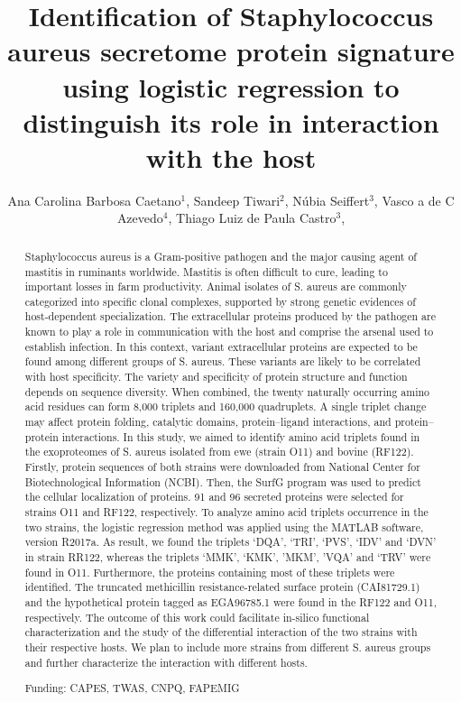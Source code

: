 \documentclass[twoside]{article}
\title{\vspace{-15mm}\fontsize{24pt}{10pt}\selectfont\textbf{ Identification of Staphylococcus aureus secretome protein signature using logistic regression to distinguish its role in interaction with the host }} %
\author{ Ana Carolina Barbosa Caetano$^{1}$, Sandeep Tiwari$^{2}$, Núbia Seiffert$^{3}$, Vasco a de C Azevedo$^{4}$, Thiago Luiz de Paula Castro$^{3}$, }
\affil{ 1 Universidade Federal de Minas Gerais

2 Institute of Biological Science, Federal University of Minas Gerais, Belo Horizonte

3 Federal University of Bahia

4 Federal University of Minas Gerais

 }
\date{}
\begin{document}
  
  
  \maketitle %
  
  
  \thispagestyle{fancy} %
  
  
  \begin{abstract}
  Staphylococcus aureus is a Gram-positive pathogen and the major causing agent of mastitis in ruminants worldwide. Mastitis is often difficult to cure, leading to important losses in farm productivity. Animal isolates of S. aureus are commonly categorized into specific clonal complexes, supported by strong genetic evidences of host-dependent specialization. The extracellular proteins produced by the pathogen are known to play a role in communication with the host and comprise the arsenal used to establish infection. In this context, variant extracellular proteins are expected to be found among different groups of S. aureus. These variants are likely to be correlated with host specificity. The variety and specificity of protein structure and function depends on sequence diversity. When combined, the twenty naturally occurring amino acid residues can form 8,000 triplets and 160,000 quadruplets. A single triplet change may affect protein folding, catalytic domains, protein–ligand interactions, and protein–protein interactions. In this study, we aimed to identify amino acid triplets found in the exoproteomes of S. aureus isolated from ewe (strain O11) and bovine (RF122). Firstly, protein sequences of both strains were downloaded from National Center for Biotechnological Information (NCBI). Then, the SurfG program was used to predict the cellular localization of proteins. 91 and 96 secreted proteins were selected for strains O11 and RF122, respectively. To analyze amino acid triplets occurrence in the two strains, the logistic regression method was applied using the MATLAB software, version R2017a. As result, we found the triplets ‘DQA’, ‘TRI’, ‘PVS’, ‘IDV’ and ‘DVN’ in strain RR122, whereas the triplets ‘MMK’, ‘KMK’, ’MKM’, ’VQA’ and ‘TRV’ were found in O11. Furthermore, the proteins containing most of these triplets were identified. The truncated methicillin resistance-related surface protein (CAI81729.1) and the hypothetical protein tagged as EGA96785.1 were found in the RF122 and O11, respectively. The outcome of this work could facilitate in-silico functional characterization and the study of the differential interaction of the two strains with their respective hosts. We plan to include more strains from different S. aureus groups and further characterize the interaction with different hosts.
  
  Funding: CAPES, TWAS, CNPQ, FAPEMIG \\ 
  \end{abstract}
  
\end{document}
